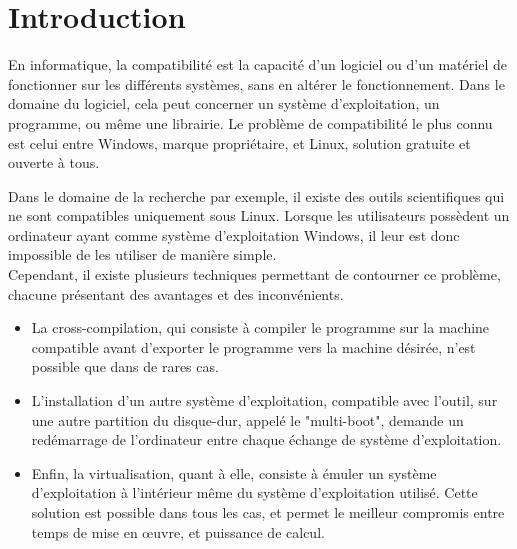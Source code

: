 \cleardoublepage

\chapter*{Introduction}





En informatique, la compatibilité est la capacité d'un logiciel ou d'un matériel de fonctionner sur les différents systèmes, sans en altérer le fonctionnement.
Dans le domaine du logiciel, cela peut concerner un système d'exploitation, un programme, ou même une librairie.
Le problème de compatibilité le plus connu est celui entre Windows, marque propriétaire, et Linux, solution gratuite et ouverte à tous.



Dans le domaine de la recherche par exemple, il existe des outils scientifiques qui ne sont compatibles uniquement sous Linux.
Lorsque les utilisateurs possèdent un ordinateur ayant comme système d'exploitation Windows, il leur est donc impossible de les utiliser de manière simple.
\\




Cependant, il existe plusieurs techniques permettant de contourner ce problème, chacune présentant des avantages et des inconvénients.
\begin{itemize}
	\item La cross-compilation, qui consiste à compiler le programme sur la machine compatible avant d'exporter le programme vers la machine désirée, n'est possible que dans de rares cas.
	\item L'installation d'un autre système d'exploitation, compatible avec l'outil, sur une autre partition du disque-dur, appelé le "multi-boot", demande un redémarrage de l'ordinateur entre chaque échange de système d'exploitation.
	\item Enfin, la virtualisation, quant à elle, consiste à émuler un système d'exploitation à l'intérieur même du système d'exploitation utilisé.
Cette solution est possible dans tous les cas, et permet le meilleur compromis entre temps de mise en œuvre, et puissance de calcul.
\\
\end{itemize}



